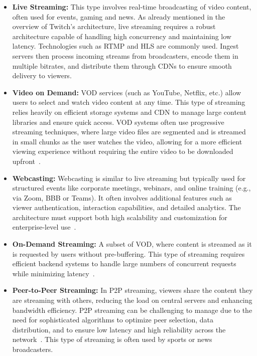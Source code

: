 \begin{itemize}
    \item \textbf{Live Streaming:} This type involves real-time broadcasting of video content, often used for events, gaming and news. As already mentioned in the overview of Twitch's architecture, live streaming requires a robust architecture capable of handling high concurrency and maintaining low latency. Technologies such as \ac{RTMP} and \ac{HLS} are commonly used. Ingest servers then process incoming streams from broadcasters, encode them in multiple bitrates, and distribute them through \ac{CDN}s to ensure smooth delivery to viewers.
    \item \textbf{Video on Demand:} \ac{VOD} services (such as YouTube, Netflix, etc.) allow users to select and watch video content at any time. This type of streaming relies heavily on efficient storage systems and \ac{CDN} to manage large content libraries and ensure quick access. \ac{VOD} systems often use progressive streaming techniques, where large video files are segmented and is streamed in small chunks as the user watches the video, allowing for a more efficient viewing experience without requiring the entire video to be downloaded upfront~\parencite{cloud_streaming_trends}.
    \item \textbf{Webcasting:} Webcasting is similar to live streaming but typically used for structured events like corporate meetings, webinars, and online training (e.g., via Zoom, BBB or Teams). It often involves additional features such as viewer authentication, interaction capabilities, and detailed analytics. The architecture must support both high scalability and customization for enterprise-level use~\parencite{cloud_streaming_trends}.
    \item \textbf{On-Demand Streaming:} A subset of \ac{VOD}, where content is streamed as it is requested by users without pre-buffering. This type of streaming requires efficient backend systems to handle large numbers of concurrent requests while minimizing latency~\parencite{cloud_streaming}.
    \item \textbf{Peer-to-Peer Streaming:} In \ac{P2P} streaming, viewers share the content they are streaming with others, reducing the load on central servers and enhancing bandwidth efficiency. \ac{P2P} streaming can be challenging to manage due to the need for sophisticated algorithms to optimize peer selection, data distribution, and to ensure low latency and high reliability across the network~\parencite{p2p}. This type of streaming is often used by sports or news broadcasters.
\end{itemize}


